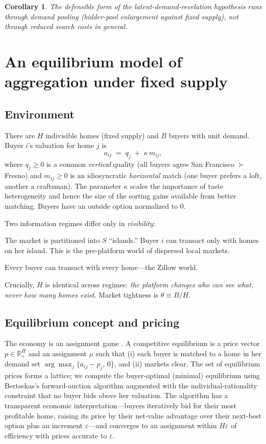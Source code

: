 \documentclass[11pt]{article}
\newtheorem{corollary}{Corollary}
\begin{document}
\begin{corollary}
The defensible form of the latent-demand-revelation hypothesis runs through demand \emph{pooling}
(bidder-pool enlargement against fixed supply), not through reduced search costs in general.
\end{corollary}

\section{An equilibrium model of aggregation under fixed supply}\label{sec:model}

\subsection{Environment}
There are $H$ indivisible homes (fixed supply) and $B$ buyers with unit demand. Buyer $i$'s
valuation for home $j$ is
\begin{equation}
a_{ij} \;=\; q_j \;+\; \kappa\, m_{ij},
\end{equation}
where $q_j\ge 0$ is a common \emph{vertical} quality (all buyers agree San Francisco $\succ$ Fresno)
and $m_{ij}\ge 0$ is an idiosyncratic \emph{horizontal} match (one buyer prefers a loft, another a
craftsman). The parameter $\kappa$ scales the importance of taste heterogeneity and hence the size
of the sorting gains available from better matching. Buyers have an outside option normalized to $0$.

Two information regimes differ only in \emph{visibility}:
\begin{description}[leftmargin=2em,itemsep=1pt]
\item[Segmented.] The market is partitioned into $S$ ``islands.'' Buyer $i$ can transact only with
homes on her island. This is the pre-platform world of dispersed local markets.
\item[Board.] Every buyer can transact with every home---the Zillow world.
\end{description}
Crucially, $H$ is identical across regimes: \emph{the platform changes who can see what, never how
many homes exist}. Market tightness is $\theta \equiv B/H$.

\subsection{Equilibrium concept and pricing}
The economy is an assignment game \citep{shapleyshubik1971}. A competitive equilibrium is a price
vector $p\in\mathbb{R}^H_+$ and an assignment $\mu$ such that (i) each buyer is matched to a home in
her demand set $\arg\max_j\{a_{ij}-p_j,\,0\}$, and (ii) markets clear. The set of equilibrium prices
forms a lattice; we compute the buyer-optimal (minimal) equilibrium using Bertsekas's forward-auction
algorithm \citep{bertsekas1988} augmented with the individual-rationality constraint that no buyer
bids above her valuation. The algorithm has a transparent economic interpretation---buyers
iteratively bid for their most profitable home, raising its price by their net-value advantage over
their next-best option plus an increment $\varepsilon$---and converges to an assignment within
$H\varepsilon$ of efficiency with prices accurate to $\varepsilon$.
\end{document}
